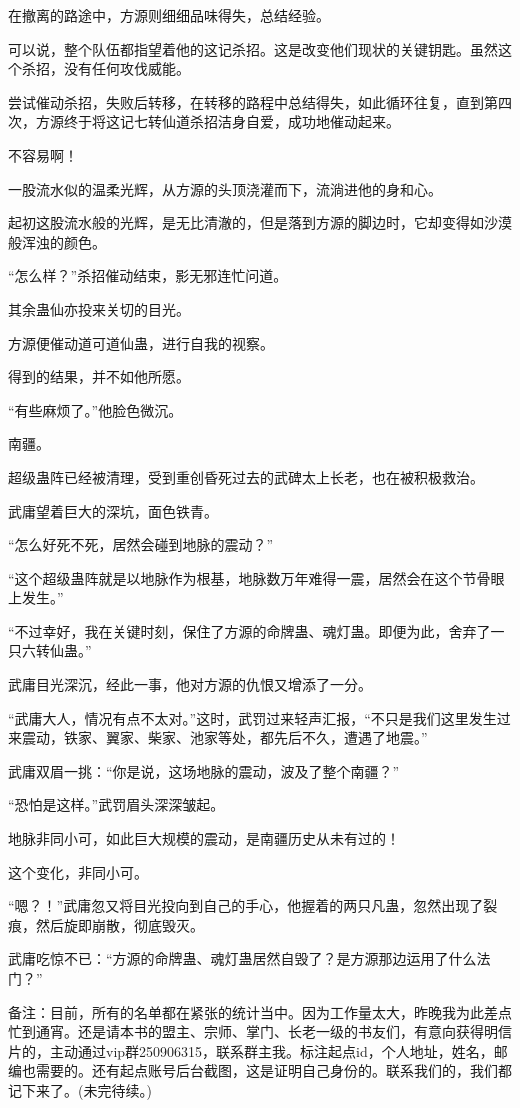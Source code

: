 \begin{this_body}
在撤离的路途中，方源则细细品味得失，总结经验。

可以说，整个队伍都指望着他的这记杀招。这是改变他们现状的关键钥匙。虽然这个杀招，没有任何攻伐威能。

尝试催动杀招，失败后转移，在转移的路程中总结得失，如此循环往复，直到第四次，方源终于将这记七转仙道杀招洁身自爱，成功地催动起来。

不容易啊！

一股流水似的温柔光辉，从方源的头顶浇灌而下，流淌进他的身和心。

起初这股流水般的光辉，是无比清澈的，但是落到方源的脚边时，它却变得如沙漠般浑浊的颜色。

“怎么样？”杀招催动结束，影无邪连忙问道。

其余蛊仙亦投来关切的目光。

方源便催动道可道仙蛊，进行自我的视察。

得到的结果，并不如他所愿。

“有些麻烦了。”他脸色微沉。

南疆。

超级蛊阵已经被清理，受到重创昏死过去的武碑太上长老，也在被积极救治。

武庸望着巨大的深坑，面色铁青。

“怎么好死不死，居然会碰到地脉的震动？”

“这个超级蛊阵就是以地脉作为根基，地脉数万年难得一震，居然会在这个节骨眼上发生。”

“不过幸好，我在关键时刻，保住了方源的命牌蛊、魂灯蛊。即便为此，舍弃了一只六转仙蛊。”

武庸目光深沉，经此一事，他对方源的仇恨又增添了一分。

“武庸大人，情况有点不太对。”这时，武罚过来轻声汇报，“不只是我们这里发生过来震动，铁家、翼家、柴家、池家等处，都先后不久，遭遇了地震。”

武庸双眉一挑：“你是说，这场地脉的震动，波及了整个南疆？”

“恐怕是这样。”武罚眉头深深皱起。

地脉非同小可，如此巨大规模的震动，是南疆历史从未有过的！

这个变化，非同小可。

“嗯？！”武庸忽又将目光投向到自己的手心，他握着的两只凡蛊，忽然出现了裂痕，然后旋即崩散，彻底毁灭。

武庸吃惊不已：“方源的命牌蛊、魂灯蛊居然自毁了？是方源那边运用了什么法门？”

备注：目前，所有的名单都在紧张的统计当中。因为工作量太大，昨晚我为此差点忙到通宵。还是请本书的盟主、宗师、掌门、长老一级的书友们，有意向获得明信片的，主动通过vip群250906315，联系群主我。标注起点id，个人地址，姓名，邮编也需要的。还有起点账号后台截图，这是证明自己身份的。联系我们的，我们都记下来了。(未完待续。)

\end{this_body}

